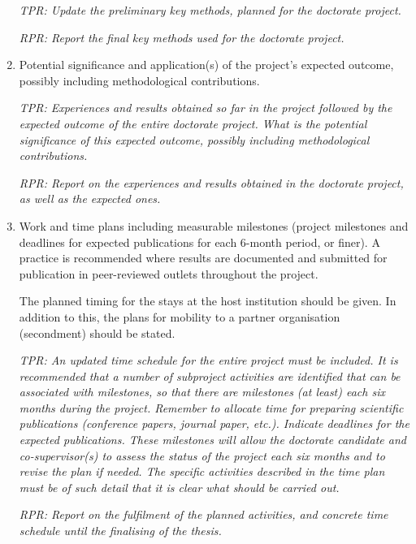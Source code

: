\documentclass[12pt]{article}
\begin{document}
\begin{enumerate}
\begin{shaded}
\emph{TPR: Update the preliminary key methods, planned for the doctorate project.}

\emph{RPR: Report the final key methods used for the doctorate project.}
\end{shaded}

\item Potential significance and application(s) of the project's expected outcome, possibly including methodological contributions.

\begin{shaded}
\emph{TPR: Experiences and results obtained so far in the project followed by the expected outcome of the entire doctorate project. What is the potential significance of this expected outcome, possibly including methodological contributions.}

\emph{RPR: Report on the experiences and results obtained in the doctorate project, as well as the expected ones.}
\end{shaded}

\item Work and time plans including measurable milestones (project milestones and deadlines for expected publications for each 6-month period, or finer).
A practice is recommended where results are documented and submitted for publication in peer-reviewed outlets throughout the project.

The planned timing for the stays at the host institution should be given. In addition to this, the plans for mobility to a partner organisation (secondment) should be stated.

\begin{shaded}
\emph{TPR: An updated time schedule for the entire project must be included. It is recommended that a number of subproject activities are identified that can be associated with milestones, so that there are milestones (at least) each six months during the project. Remember to allocate time for preparing scientific publications (conference papers, journal paper, etc.). Indicate deadlines for the expected publications. These milestones will allow the doctorate candidate and co-supervisor(s) to assess the status of the project each six months and to revise the plan if needed. The specific activities described in the time plan must be of such detail that it is clear what should be carried out.}

\emph{RPR: Report on the fulfilment of the planned activities, and concrete time schedule until the finalising of the thesis.}
\end{shaded}


\end{enumerate}
\end{document}
